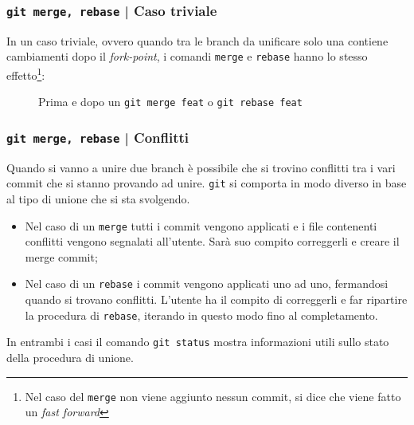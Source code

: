 \documentclass{beamer}
\begin{document}
\begin{frame}
  \label{trivial}
  \frametitle{\texttt{git merge, rebase} | Caso triviale}
  In un caso triviale, ovvero quando tra le branch da unificare solo una contiene
  cambiamenti dopo il \emph{fork-point}, i comandi \texttt{merge} e \texttt{rebase}
  hanno lo stesso effetto\footnote{Nel caso del \texttt{merge} non viene
  aggiunto nessun commit, si dice che viene fatto un \emph{fast forward}}:
  \begin{figure}
    \centering
    \quad
    \caption{Prima e dopo un \texttt{git merge feat} o \texttt{git rebase feat}}
  \end{figure}
\end{frame}

\begin{frame}
  \label{conflict}
  \frametitle{\texttt{git merge, rebase} | Conflitti}
  Quando si vanno a unire due branch \`e possibile che si trovino conflitti tra
  i vari commit che si stanno provando ad unire. \texttt{git} si comporta in modo diverso
  in base al tipo di unione che si sta svolgendo.
  \begin{itemize}
    \item<1-> Nel caso di un \texttt{merge} tutti i commit vengono applicati e 
      i file contenenti conflitti vengono segnalati all'utente. Sar\`a suo
      compito correggerli e creare il merge commit;
    \item<2-> Nel caso di un \texttt{rebase} i commit vengono applicati uno ad
      uno, fermandosi quando si trovano conflitti. L'utente ha il compito di
      correggerli e far ripartire la procedura di \texttt{rebase}, iterando
      in questo modo fino al completamento.
  \end{itemize}
  In entrambi i casi il comando \texttt{git status} mostra informazioni utili
  sullo stato della procedura di unione.
\end{frame}
\end{document}
